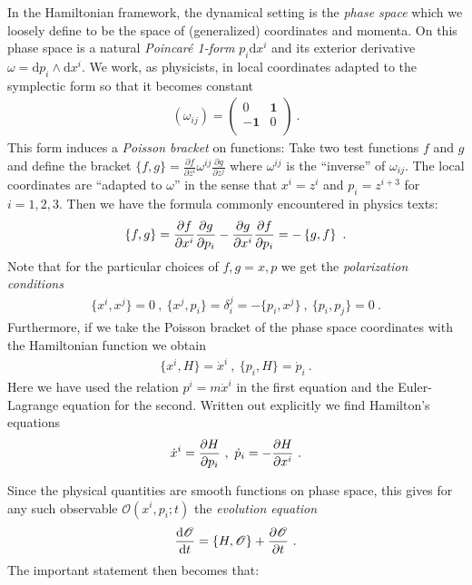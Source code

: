 \documentclass[12pt]{article}
\begin{document}
In the Hamiltonian framework, the dynamical setting is the {\em phase space} which we loosely define to be the space of (generalized) coordinates and momenta. On this phase space is a natural {\em Poincar\'e 1-form} $p_i \mathrm d x^i$ and its exterior derivative $\omega=\mathrm d p_i\wedge \mathrm d x^i$. We work, as physicists, in local coordinates adapted to the symplectic form so that it becomes constant 
\begin{eqnarray}
(\omega_{ij})=\left(   \begin{array}{cc} %
      0 &  \mathbf 1  \\
      -\mathbf 1 & 0 \\
   \end{array}
   \right)~.
\end{eqnarray} 
This form induces a {\em Poisson bracket} on functions: Take two test functions $f$ and $g$ and define the bracket $\{f, g\}=\frac{\partial f}{\partial z^i}\omega^{ij} \frac{\partial g}{\partial z^j}$ where $\omega^{ij}$ is the ``inverse'' of $\omega_{ij}$. The local coordinates are ``adapted to $\omega$'' in the sense that $x^i=z^i$ and $p_i=z^{i+3}$ for $i=1,2,3$. Then we have the formula commonly encountered in physics texts:
\begin{eqnarray}
\left\{ f, g\right\}={\partial f\over \partial x^i}{\partial g\over \partial p_i}-{\partial g\over \partial x^i}{\partial f\over \partial p_i}=-\left\{ g, f\right\}~.
\end{eqnarray}
Note that for the particular choices of $f, g=x, p$ we get the {\em polarization conditions}
\begin{eqnarray}
\{x^i, x^j\}=0~,~\{x^j, p_i\}=\delta_i^j=-\{p_i, x^j\}~,~\{p_i, p_j\}=0~.
\end{eqnarray}
Furthermore, if we take the Poisson bracket of the phase space coordinates with the Hamiltonian function we obtain 
\begin{eqnarray}
\{x^i,H\}=\dot x^i~,~\{p_i,H\}=\dot p_i~.
\end{eqnarray}
Here we have used the relation $p^i=m\dot x^i$ in the first equation and the Euler-Lagrange equation for the second. Written out explicitly we find Hamilton's equations
\begin{eqnarray}
\dot x^i={\partial H\over \partial p_i}~,~\dot p_i=-{\partial H\over \partial x^i}~.
\end{eqnarray}

Since the physical quantities are smooth functions on phase space, this gives for any such observable $\mathscr O(x^i, p_i;t)$ the {\em evolution equation}
\begin{eqnarray}
{\mathrm d \mathscr O\over\mathrm d t}=\{ H, \mathscr O\}+{\partial \mathscr O\over \partial t}~.
\end{eqnarray}
The important statement then becomes that: 
\end{document}
